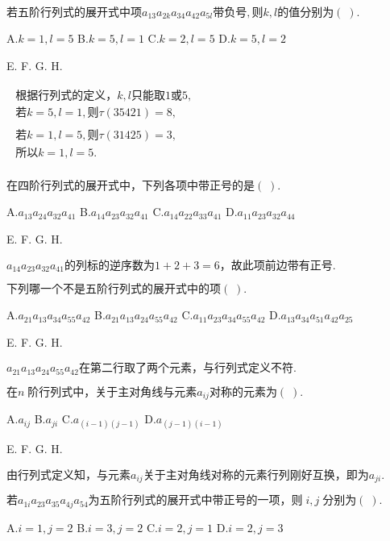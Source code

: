 
$\mathrm{若五阶行列式的展开式中项}a_{13}a_{2k}a_{34}a_{42}a_{5l}\mathrm{带负号},\mathrm 则k,l\mathrm{的值分别为}(\;).$

A.$k=1,l=5$   B.$k=5,l=1$   C.$k=2,l=5$   D.$k=5,l=2$

E.   F.   G.   H.

$\begin{array}{l}\begin{array}{l}\mathrm{根据行列式的定义}，k,l\mathrm{只能取}1或5,\\若k=5,l=1,则\tau(35421)=8,\end{array}\\\begin{array}{l}若k=1,l=5,则\tau(31425)=3,\\\mathrm{所以}k=1,l=5.\\\end{array}\end{array}$


$\mathrm{在四阶行列式的展开式中}，\mathrm{下列各项中带正号的是}(\;).$

A.$a_{13}a_{24}a_{32}a_{41}$   B.$a_{14}a_{23}a_{32}a_{41}$   C.$a_{14}a_{22}a_{33}a_{41}$   D.$a_{11}a_{23}a_{32}a_{44}$

E.   F.   G.   H.

$a_{14}a_{23}a_{32}a_{41}\mathrm{的列标的逆序数为}1+2+3=6，\mathrm{故此项前边带有正号}.$


$\mathrm{下列哪一个不是五阶行列式的展开式中的项}(\;).$

A.$a_{21}a_{13}a_{34}a_{55}a_{42}$   B.$a_{21}a_{13}a_{24}a_{55}a_{42}$   C.$a_{11}a_{23}a_{34}a_{55}a_{42}$   D.$a_{13}a_{34}a_{51}a_{42}a_{25}$

E.   F.   G.   H.

$a_{21}a_{13}a_{24}a_{55}a_{42}\mathrm{在第二行取了两个元素}，\mathrm{与行列式定义不符}.$


$在n\;\mathrm{阶行列式中}，\mathrm{关于主对角线与元素}a_{ij}\mathrm{对称的元素为}(\;).$

A.$a_{ij}$   B.$a_{ji}$   C.$a_{(i-1)(j-1)}$   D.$a_{(j-1)(i-1)}$

E.   F.   G.   H.

$\mathrm{由行列式定义知}，\mathrm{与元素}a_{ij}\mathrm{关于主对角线对称的元素行列刚好互换}，\mathrm{即为}a_{ji}.$


$若a_{1i}a_{23}a_{35}a_{4j}a_{54}\mathrm{为五阶行列式的展开式中带正号的一项}，则\;i,j\;\mathrm{分别为}(\;).$

A.$i=1,j=2$   B.$i=3,j=2$   C.$i=2,j=1$   D.$i=2,j=3$


